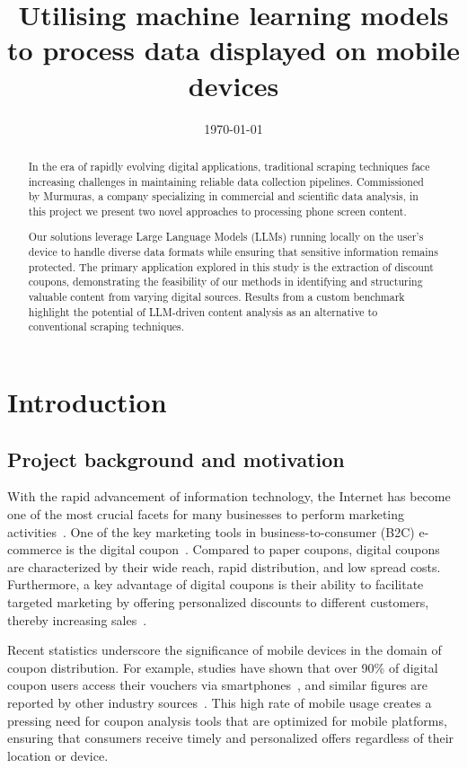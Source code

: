\documentclass[licencjacka,en]{pracamgr}
\title{Utilising machine learning models to process data displayed on mobile devices}
\date{\today}
\begin{document}
\maketitle

\begin{abstract}
In the era of rapidly evolving digital applications, traditional scraping techniques face increasing challenges in maintaining reliable data collection pipelines. Commissioned by Murmuras, a company specializing in commercial and scientific data analysis, in this project we present two novel approaches to processing phone screen content.

Our solutions leverage Large Language Models (LLMs) running locally on the user’s device to handle diverse data formats while ensuring that sensitive information remains protected. The primary application explored in this study is the extraction of discount coupons, demonstrating the feasibility of our methods in identifying and structuring valuable content from varying digital sources. Results from a custom benchmark highlight the potential of LLM-driven content analysis as an alternative to conventional scraping techniques.
\end{abstract}

\tableofcontents
\listoffigures
\listoftables

\chapter{Introduction}\label{chap:introduction}

\section{Project background and motivation}
With the rapid advancement of information technology, the Internet has become one of the most crucial facets for many businesses to perform marketing activities~\cite{design_of_coupons}. One of the key marketing tools in business-to-consumer (B2C) e-commerce is the digital coupon~\cite{targeted_reminders}. Compared to paper coupons, digital coupons are characterized by their wide reach, rapid distribution, and low spread costs. Furthermore, a key advantage of digital coupons is their ability to facilitate targeted marketing by offering personalized discounts to different customers, thereby increasing sales~\cite{design_of_coupons}.

Recent statistics underscore the significance of mobile devices in the domain of coupon distribution. For example, studies have shown that over 90\% of digital coupon users access their vouchers via smartphones~\cite{emarketer_coupon_stats}, and similar figures are reported by other industry sources~\cite{coupon_stats_2}. This high rate of mobile usage creates a pressing need for coupon analysis tools that are optimized for mobile platforms, ensuring that consumers receive timely and personalized offers regardless of their location or device.
\end{document}
